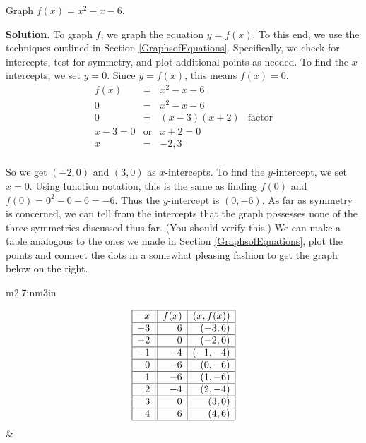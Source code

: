 \begin{ex}  Graph $f(x) = x^2 - x - 6$.

\medskip

{\bf Solution.}  To graph $f$, we graph the equation $y = f(x)$.  To this end, we use the techniques outlined in Section \ref{GraphsofEquations}.  Specifically, we check for intercepts, test for symmetry, and plot additional points as needed.  To find the $x$-intercepts, we set $y=0$. Since $y = f(x)$, this means $f(x) = 0$. \[ \begin{array}{rclr}   

f(x) & = & x^2 - x - 6 & \\ 
0 & = & x^2 - x - 6 & \\ 
0 & = & (x-3)(x+2) & \mbox{factor} \\ 
x-3 = 0 & \mbox{or} & x+2 = 0 & \\
x & = & -2, 3 & \\

\end{array} \]

So we get $(-2,0)$ and $(3,0)$ as $x$-intercepts.  To find the $y$-intercept, we set $x=0$.  Using function notation, this is the same as finding $f(0)$ and  $f(0) = 0^2 - 0 - 6 = -6.$  Thus the $y$-intercept is $(0,-6)$.  As far as symmetry is concerned, we can tell from the intercepts that the graph possesses none of the three symmetries discussed thus far. (You should verify this.)  We can make a table analogous to the ones we made in Section \ref{GraphsofEquations}, plot the points and connect the dots in a somewhat pleasing fashion to get the graph below on the right.

\hspace{.5in} \begin{tabular}{m{2.7in}m{3in}}

\[ \begin{array}{|r||r|r|}  

\hline

 x & f(x) & (x,f(x)) \\ \hline
-3  & 6 & (-3, 6) \\  \hline
-2  & 0 & (-2,0) \\  \hline
-1 & -4 & ( -1, -4) \\  \hline
0  & -6 & ( 0 ,-6) \\  \hline
1 & -6 & ( 1, -6) \\  \hline
2  & -4 & (2,-4) \\  \hline
3  & 0 & (3, 0) \\  \hline
4  & 6 & (4, 6) \\  \hline
\end{array} \] &


\end{tabular}
\end{ex}
